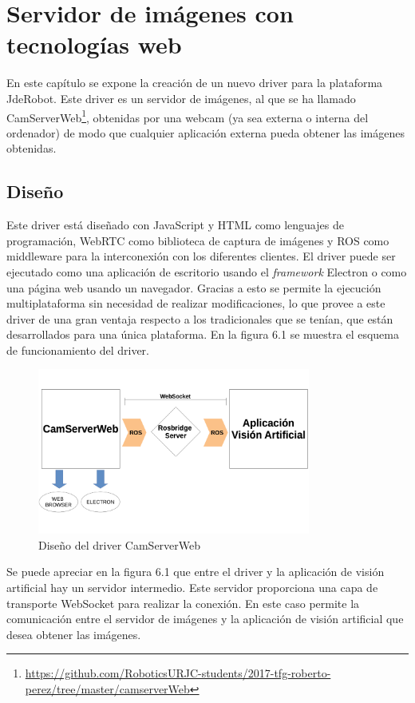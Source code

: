 \chapter{Servidor de imágenes con tecnologías web }\label{cap.camserver}
En este capítulo se expone la creación de un nuevo driver para la plataforma JdeRobot. Este driver es un servidor de imágenes, al que se ha llamado CamServerWeb\footnote{\url{https://github.com/RoboticsURJC-students/2017-tfg-roberto-perez/tree/master/camserverWeb}}, obtenidas por una webcam (ya sea externa o interna del ordenador) de modo que cualquier aplicación externa pueda obtener las imágenes obtenidas.
\section{Diseño}
Este driver está diseñado con JavaScript y HTML como lenguajes de programación, WebRTC como biblioteca de captura de imágenes y ROS como middleware para la interconexión con los diferentes clientes. El driver puede ser ejecutado como una aplicación de escritorio usando el \textit{framework} Electron o como una página web usando un navegador. Gracias a esto se permite la ejecución multiplataforma sin necesidad de realizar modificaciones, lo que provee a este driver de una gran ventaja respecto a los tradicionales que se tenían, que están desarrollados para una única plataforma.  En la figura 6.1 se muestra el esquema de funcionamiento del driver.
\begin{figure}[H]
  \begin{center}
    \includegraphics[width=0.8\textwidth]{figures/cajanegracamserver.png}
		\caption{Diseño del driver CamServerWeb}
		\label{fig.diseñocamserver}
		\end{center}
\end{figure}

Se puede apreciar en la figura 6.1 que entre el driver y la aplicación de visión artificial hay un servidor intermedio. Este servidor proporciona una capa de transporte WebSocket para realizar la conexión. En este caso permite la comunicación entre el servidor de imágenes y la aplicación de visión artificial que desea obtener las imágenes.

